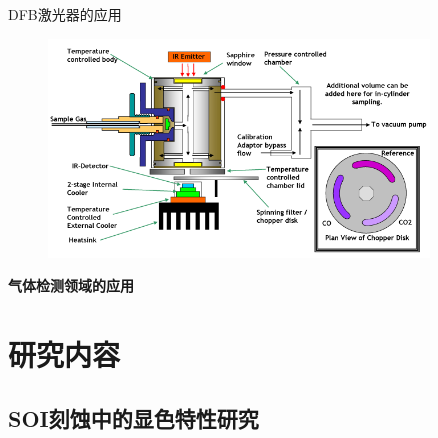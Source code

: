 \documentclass{beamer}
\begin{document}
\begin{frame}{\mbox{DFB}激光器的应用}
\centering
\begin{figure}
	\includegraphics[width=0.9\textwidth]{../Pictures/intro_ndir.PNG}
\end{figure}
\bfseries
气体检测领域的应用
\end{frame}

\section{研究内容}
\subsection{\mbox{SOI}刻蚀中的显色特性研究}
\frame{\tableofcontents[currentsubsection]}
\end{document}
